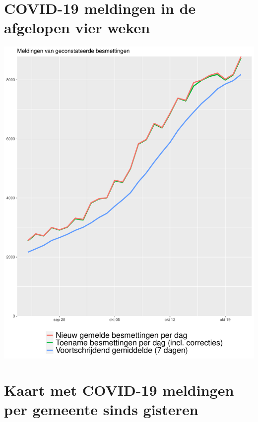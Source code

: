 \documentclass[
  english,
  man,floatsintext]{apa6}
\begin{document}
\newpage

\hypertarget{covid-19-meldingen-in-de-afgelopen-vier-weken}{%
\section{COVID-19 meldingen in de afgelopen vier weken}\label{covid-19-meldingen-in-de-afgelopen-vier-weken}}

\includegraphics{daily_report_files/figure-latex/Gemelde besmettingen-1.pdf}

\newpage

\hypertarget{kaart-met-covid-19-meldingen-per-gemeente-sinds-gisteren}{%
\section{Kaart met COVID-19 meldingen per gemeente sinds gisteren}\label{kaart-met-covid-19-meldingen-per-gemeente-sinds-gisteren}}
\end{document}
